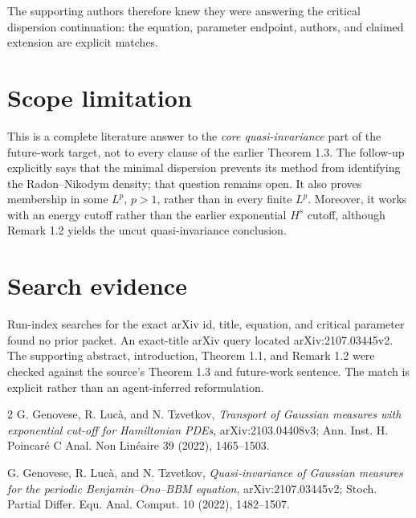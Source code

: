 \documentclass[11pt]{article}
\begin{document}
The supporting authors therefore knew they were answering the critical
dispersion continuation: the equation, parameter endpoint, authors, and
claimed extension are explicit matches.

\newpage
\section*{Scope limitation}

This is a complete literature answer to the \emph{core quasi-invariance}
part of the future-work target, not to every clause of the earlier Theorem
1.3.  The follow-up explicitly says that the minimal dispersion prevents its
method from identifying the Radon--Nikodym density; that question remains
open.  It also proves membership in some $L^p$, $p>1$, rather than in every
finite $L^p$.  Moreover, it works with an energy cutoff rather than the
earlier exponential $H^s$ cutoff, although Remark 1.2 yields the uncut
quasi-invariance conclusion.

\section*{Search evidence}

Run-index searches for the exact arXiv id, title, equation, and critical
parameter found no prior packet.  An exact-title arXiv query located
arXiv:2107.03445v2.  The supporting abstract, introduction, Theorem 1.1, and
Remark 1.2 were checked against the source's Theorem 1.3 and future-work
sentence.  The match is explicit rather than an agent-inferred reformulation.

\begin{thebibliography}{2}
G. Genovese, R. Luc\`a, and N. Tzvetkov,
\emph{Transport of Gaussian measures with exponential cut-off for Hamiltonian PDEs},
arXiv:2103.04408v3; Ann. Inst. H. Poincar\'e C Anal. Non Lin\'eaire 39 (2022), 1465--1503.

G. Genovese, R. Luc\`a, and N. Tzvetkov,
\emph{Quasi-invariance of Gaussian measures for the periodic Benjamin--Ono--BBM equation},
arXiv:2107.03445v2; Stoch. Partial Differ. Equ. Anal. Comput. 10 (2022), 1482--1507.
\end{thebibliography}
\end{document}
